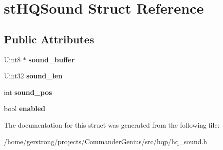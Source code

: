 \hypertarget{structst_h_q_sound}{
\section{stHQSound Struct Reference}
\label{structst_h_q_sound}
}
\subsection*{Public Attributes}
\begin{DoxyCompactItemize}
\item 
\hypertarget{structst_h_q_sound_ac35016f4d6d5683b49f28c4d5d766cea}{
Uint8 $\ast$ {\bfseries sound\_\-buffer}}
\label{structst_h_q_sound_ac35016f4d6d5683b49f28c4d5d766cea}

\item 
\hypertarget{structst_h_q_sound_a2a113842e34cd2eaac5c1a51d1768b76}{
Uint32 {\bfseries sound\_\-len}}
\label{structst_h_q_sound_a2a113842e34cd2eaac5c1a51d1768b76}

\item 
\hypertarget{structst_h_q_sound_a2ad867ac70da3fd262cdc7f51c6e3e29}{
int {\bfseries sound\_\-pos}}
\label{structst_h_q_sound_a2ad867ac70da3fd262cdc7f51c6e3e29}

\item 
\hypertarget{structst_h_q_sound_a01363f9052385a1fbd54688e97fa0db9}{
bool {\bfseries enabled}}
\label{structst_h_q_sound_a01363f9052385a1fbd54688e97fa0db9}

\end{DoxyCompactItemize}


The documentation for this struct was generated from the following file:\begin{DoxyCompactItemize}
\item 
/home/gerstrong/projects/CommanderGenius/src/hqp/hq\_\-sound.h\end{DoxyCompactItemize}
